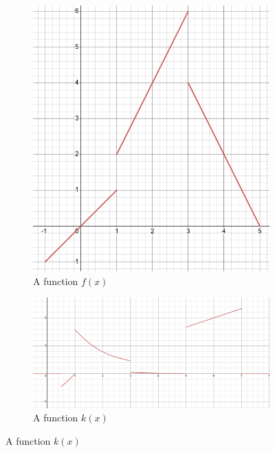 \documentclass[12pt,a4paper]{article}
\begin{document}
	\begin{figure}[ht]
	\centering
		\begin{subfigure}[b]{0.45\textwidth}
			\centering
			\includegraphics[scale=0.35]{PieceCont1.png}
			\caption{A function $f(x)$}
		\end{subfigure}
		\vspace*{12pt}
		
		\begin{subfigure}[b]{1\textwidth}
			\centering
			\includegraphics[scale=0.25]{PieceCont4.png}
			\caption{A function $k(x)$}
		\end{subfigure}
		\vspace*{12pt}
		

\end{figure}
\end{document}
